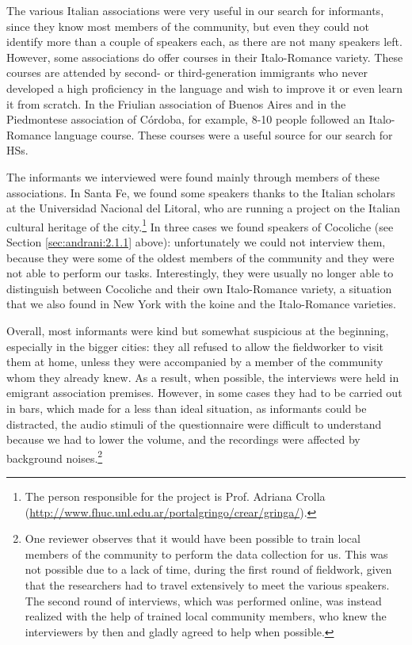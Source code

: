 \documentclass[output=paper,hidelinks]{langscibook}
\begin{document}
The various Italian associations were very useful in our search for informants, since they know most members of the community, but even they could not identify more than a couple of speakers each, as there are not many speakers left. However, some associations do offer courses in their Italo-Romance variety. These courses are attended by second- or third-generation immigrants who never developed a high proficiency in the language and wish to improve it or even learn it from scratch. In the Friulian association of Buenos Aires and in the Piedmontese association of Córdoba, for example, 8-10 people followed an Italo-Romance language course. These courses were a useful source for our search for HSs.

The informants we interviewed were found mainly through members of these associations. In Santa Fe, we found some speakers thanks to the Italian scholars at the Universidad Nacional del Litoral, who are running a project on the Italian cultural heritage of the city.\footnote{The person responsible for the project is Prof. Adriana Crolla (\url{http://www.fhuc.unl.edu.ar/portalgringo/crear/gringa/}).} In three cases we found speakers of Cocoliche (see Section \ref{sec:andrani:2.1.1} above): unfortunately we could not interview them, because they were some of the oldest members of the community and they were not able to perform our tasks. Interestingly, they were usually no longer able to distinguish between Cocoliche and their own Italo-Romance variety, a situation that we also found in New York with the koine and the Italo-Romance varieties.

Overall, most informants were kind but somewhat suspicious at the beginning, especially in the bigger cities: they all refused to allow the fieldworker to visit them at home, unless they were accompanied by a member of the community whom they already knew. As a result, when possible, the interviews were held in emigrant association premises. However, in some cases they had to be carried out in bars, which made for a less than ideal situation, as informants could be distracted, the audio stimuli of the questionnaire were difficult to understand because we had to lower the volume, and the recordings were affected by background noises.\footnote{One reviewer observes that it would have been possible to train local members of the community to perform the data collection for us. This was not possible due to a lack of time, during the first round of fieldwork, given that the researchers had to travel extensively to meet the various speakers. The second round of interviews, which was performed online, was instead realized with the help of trained local community members, who knew the interviewers by then and gladly agreed to help when possible.} 
\end{document}
